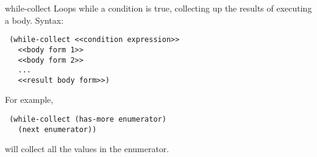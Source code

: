 \begin{okbcfspec}{while-collect}
Loops while a condition is true, collecting up the results of
executing a body.
Syntax:
\begin{verbatim}
 (while-collect <<condition expression>>
   <<body form 1>>
   <<body form 2>>
   ...
   <<result body form>>)
\end{verbatim}
For example,
\begin{verbatim}
 (while-collect (has-more enumerator)
   (next enumerator))
\end{verbatim}
will collect all the values in the enumerator.
\end{okbcfspec}
